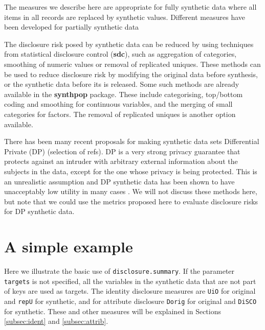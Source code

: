 \documentclass[12pt]{article}
\begin{document}
The measures we describe here are appropriate for fully synthetic data where all items in all records are replaced by synthetic values. Different measures have been developed for partially synthetic data \cite{DrechslerReiter2009,ReiterMitra2009}

The disclosure risk posed by synthetic data can be reduced by using techniques from statistical disclosure control (\textbf{sdc}), such as aggregation of categories, smoothing of numeric values or removal of replicated uniques. These methods can be used to reduce disclosure risk by modifying the original data before synthesis, or the synthetic data before its is released. Some such methods are already available in the \textbf{synthpop} package. These include categorising, top/bottom coding and smoothing for continuous variables, and the merging of small categories for factors. The removal of replicated uniques is another option available.

There has been many recent proposals for making synthetic data sets Differential Private (DP) (selection of refs). DP is a very strong privacy guarantee that protects against an intruder with arbitrary external information about the subjects in the data, except for the one whose privacy is being protected. This is an unrealistic assumption and DP synthetic data has been shown to have unacceptably low utility in many cases \cite{bowen_ss, groundhog}. We will not discuss these methods here, but note that we could use the metrics proposed here to evaluate disclosure risks for DP synthetic data. 




\section[A simple example]{A simple example}\label{sec:simpexamp}
Here we illustrate the basic use of \texttt{disclosure.summary}. If the parameter \texttt{targets} is not specified, all the variables in the synthetic data that are not part of keys are used as targets.
The identity disclosure measures are \texttt{UiO} for original and \texttt{repU} for synthetic, and for attribute disclosure \texttt{Dorig} for original and \texttt{DiSCO} for synthetic. These and other measures will be explained in Sections \ref{subsec:ident} and \ref{subsec:attrib}.
\end{document}
